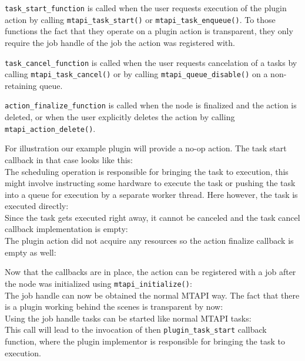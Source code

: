 \lstinline|task_start_function| is called when the user requests execution of the plugin action by calling \lstinline|mtapi_task_start()| or \lstinline|mtapi_task_enqueue()|. To those functions the fact that they operate on a plugin action is transparent, they only require the job handle of the job the action was registered with.

\lstinline|task_cancel_function| is called when the user requests cancelation of a tasks by calling \lstinline|mtapi_task_cancel()| or by calling \lstinline|mtapi_queue_disable()| on a non-retaining queue.

\lstinline|action_finalize_function| is called when the node is finalized and the action is deleted, or when the user explicitly deletes the action by calling \lstinline|mtapi_action_delete()|.

For illustration our example plugin will provide a no-op action. The task start callback in that case looks like this:
%
\\
%
The scheduling operation is responsible for bringing the task to execution, this might involve instructing some hardware to execute the task or pushing the task into a queue for execution by a separate worker thread. Here however, the task is executed directly:
%
\\
%
Since the task gets executed right away, it cannot be canceled and the task cancel callback implementation is empty:
%
\\
%
The plugin action did not acquire any resources so the action finalize callback is empty as well:
%
\\
%

Now that the callbacks are in place, the action can be registered with a job after the node was initialized using \lstinline|mtapi_initialize()|:
%
\\
%
The job handle can now be obtained the normal MTAPI way. The fact that there is a plugin working behind the scenes is transparent by now:
%
\\
%
Using the job handle tasks can be started like normal MTAPI tasks:
%
\\
%
This call will lead to the invocation of then \lstinline|plugin_task_start| callback function, where the plugin implementor is responsible for bringing the task to execution.

